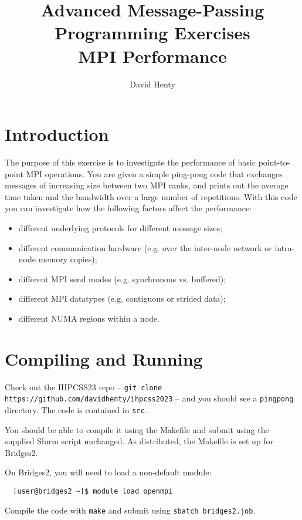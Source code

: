 \documentclass{article}
\begin{document}
\title{Advanced Message-Passing Programming Exercises \\
	MPI Performance}

\author{David Henty}
\date{}
\makeEPCCtitle

\section{Introduction}

The purpose of this exercise is to investigate the performance of
basic point-to-point MPI operations. You are given a simple ping-pong
code that exchanges messages of increasing size between two MPI ranks,
and prints out the average time taken and the bandwidth over a large
number of repetitions. With this code you can investigate how the
following factors affect the performance:

\begin{itemize}

\item different underlying protocols for different message sizes;
\item different communication hardware (e.g. over the inter-node network or
  intra-node memory copies);
\item different MPI send modes (e.g. synchronous vs. buffered);
\item different MPI datatypes (e.g. contiguous or strided data);
\item different NUMA regions within a node.

\end{itemize}

\section{Compiling and Running}

Check out the IHPCSS23 repo -- \texttt{git clone
  https://github.com/davidhenty/ihpcss2023} -- and you should see a
\texttt{pingpong} directory. The code is contained in \texttt{src}.

You should be able to compile it using the Makefile and submit using
the supplied Slurm script unchanged. As distributed, the Makefile is
set up for Bridges2.

On Bridges2, you will need to load a non-default module:
\begin{verbatim}
  [user@bridges2 ~]$ module load openmpi
\end{verbatim}

Compile the code with \texttt{make} and submit using \texttt{sbatch
  bridges2.job}.
\end{document}
